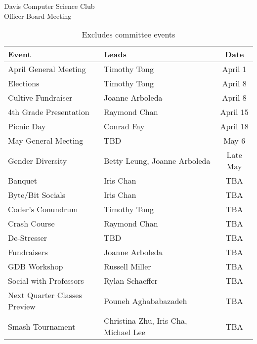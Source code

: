 \documentclass{article}
\begin{document}
\begin{Minutes}{Davis Computer Science Club\\Officer Board Meeting}
\begin{table}[h]
	\centering
	\renewcommand*{\arraystretch}{1.5}
	\begin{tabular}{l l c}
		Event
			&	Leads
			&	Date\\
		\hline
		April General Meeting
			&	Timothy Tong
			&	April 1\\
		Elections
			&	Timothy Tong
			&	April 8\\
		Cultive Fundraiser
			&	Joanne Arboleda
			&	April 8\\
		4th Grade Presentation	
			&	Raymond Chan
			&	April 15\\
		Picnic Day
			&	Conrad Fay
			&	April 18\\
		May General Meeting
			&	TBD
			&	May 6\\
		Gender Diversity	
			&	Betty Leung, Joanne Arboleda	
			&	Late May\\
		Banquet
			&	Iris Chan
			&	TBA\\
		Byte/Bit Socials
			& 	Iris Chan
			&	TBA\\
		Coder's Conundrum	
			&	Timothy Tong	
			&	TBA\\
		Crash Course
			&	Raymond Chan
			&	TBA\\
		De-Stresser
			&	TBD
			&	TBA\\
		Fundraisers
			&	Joanne Arboleda
			& 	TBA\\
		GDB Workshop		
			&	Russell Miller	
			&	TBA\\
		Social with Professors
			&	Rylan Schaeffer
			&	TBA\\
		Next Quarter Classes Preview
			&	Pouneh Aghababazadeh
			&	TBA\\
		Smash Tournament	
			&	Christina Zhu, Iris Cha, Michael Lee
			&	TBA\\
	\end{tabular}
	\caption*{Excludes committee events}
\end{table}


\end{Minutes}
\end{document}
